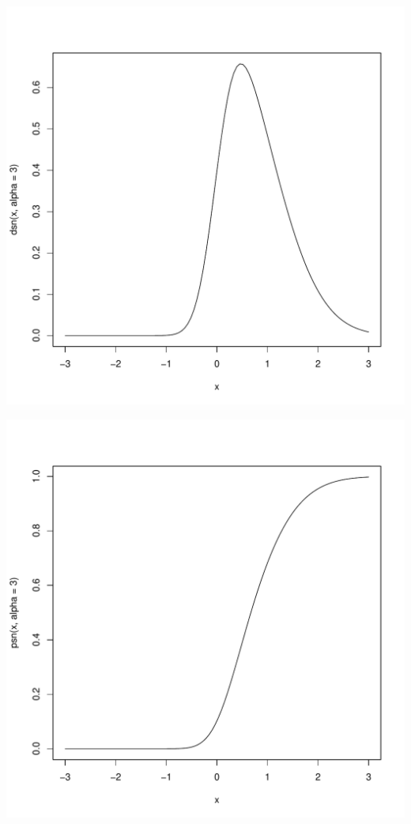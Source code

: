 \documentclass{article}\usepackage[]{graphicx}\usepackage[]{color}
\makeatletter
\def\maxwidth{ %
  \ifdim\Gin@nat@width>\linewidth
    \linewidth
  \else
    \Gin@nat@width
  \fi
}
\newenvironment{knitrout}{}{} %
\makeatother
\begin{document}
\begin{knitrout}
\color{fgcolor}
\includegraphics[width=\maxwidth]{figure/unnamed-chunk-8-1} 

\includegraphics[width=\maxwidth]{figure/unnamed-chunk-8-2} 


\end{knitrout}
\end{document}
